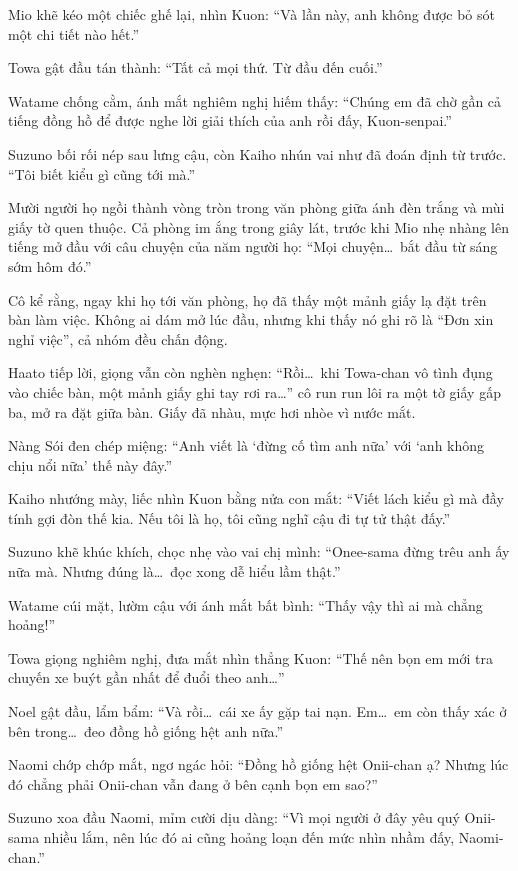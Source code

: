 \documentclass[../main.tex]{subfiles}
\begin{document}
Mio khẽ kéo một chiếc ghế lại, nhìn Kuon: ``Và lần này, anh không được bỏ sót một chi tiết nào hết.''

Towa gật đầu tán thành: ``Tất cả mọi thứ. Từ đầu đến cuối.''

Watame chống cằm, ánh mắt nghiêm nghị hiếm thấy: ``Chúng em đã chờ gần cả tiếng đồng hồ để được nghe lời giải thích của anh rồi đấy, Kuon-senpai.''

Suzuno bối rối nép sau lưng cậu, còn Kaiho nhún vai như đã đoán định từ trước. ``Tôi biết kiểu gì cũng tới mà.''

\ct

Mười người họ ngồi thành vòng tròn trong văn phòng giữa ánh đèn trắng và mùi giấy tờ quen thuộc. Cả phòng im ắng trong giây lát, trước khi Mio nhẹ nhàng lên tiếng mở đầu với câu chuyện của năm người họ: ``Mọi chuyện\dots\ bắt đầu từ sáng sớm hôm đó.''

Cô kể rằng, ngay khi họ tới văn phòng, họ đã thấy một mảnh giấy lạ đặt trên bàn làm việc. Không ai dám mở lúc đầu, nhưng khi thấy nó ghi rõ là ``Đơn xin nghỉ việc'', cả nhóm đều chấn động.

Haato tiếp lời, giọng vẫn còn nghèn nghẹn: ``Rồi\dots\ khi Towa-chan vô tình đụng vào chiếc bàn, một mảnh giấy ghi tay rơi ra\dots'' cô run run lôi ra một tờ giấy gấp ba, mở ra đặt giữa bàn. Giấy đã nhàu, mực hơi nhòe vì nước mắt.

Nàng Sói đen chép miệng: ``Anh viết là `đừng cố tìm anh nữa' với `anh không chịu nổi nữa' thế này đây.''

Kaiho nhướng mày, liếc nhìn Kuon bằng nửa con mắt: ``Viết lách kiểu gì mà đầy tính gợi đòn thế kia. Nếu tôi là họ, tôi cũng nghĩ cậu đi tự tử thật đấy.''

Suzuno khẽ khúc khích, chọc nhẹ vào vai chị mình: ``Onee-sama đừng trêu anh ấy nữa mà. Nhưng đúng là\dots\ đọc xong dễ hiểu lầm thật.''

Watame cúi mặt, lườm cậu với ánh mắt bất bình: ``Thấy vậy thì ai mà chẳng hoảng!''

Towa giọng nghiêm nghị, đưa mắt nhìn thẳng Kuon: ``Thế nên bọn em mới tra chuyến xe buýt gần nhất để đuổi theo anh\dots''

Noel gật đầu, lẩm bẩm: ``Và rồi\dots\ cái xe ấy gặp tai nạn. Em\dots\ em còn thấy xác ở bên trong\dots\ đeo đồng hồ giống hệt anh nữa.''

Naomi chớp chớp mắt, ngơ ngác hỏi: ``Đồng hồ giống hệt Onii-chan ạ? Nhưng lúc đó chẳng phải Onii-chan vẫn đang ở bên cạnh bọn em sao?''

Suzuno xoa đầu Naomi, mỉm cười dịu dàng: ``Vì mọi người ở đây yêu quý Onii-sama nhiều lắm, nên lúc đó ai cũng hoảng loạn đến mức nhìn nhầm đấy, Naomi-chan.''
\end{document}
